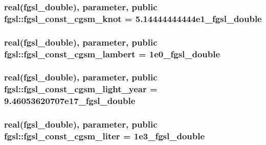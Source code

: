 \hypertarget{classfgsl_a7b637a368f16bed373b7ff18193b8417}{
\subsubsection[{fgsl\-\_\-const\-\_\-cgsm\-\_\-knot}]{\setlength{\rightskip}{0pt plus 5cm}real({\bf fgsl\-\_\-double}), parameter, public fgsl\-::fgsl\-\_\-const\-\_\-cgsm\-\_\-knot = 5.\-14444444444e1\-\_\-fgsl\-\_\-double}}\label{classfgsl_a7b637a368f16bed373b7ff18193b8417}
\hypertarget{classfgsl_a9dcbf51e3d416e2da01a503e5ba573bc}{
\subsubsection[{fgsl\-\_\-const\-\_\-cgsm\-\_\-lambert}]{\setlength{\rightskip}{0pt plus 5cm}real({\bf fgsl\-\_\-double}), parameter, public fgsl\-::fgsl\-\_\-const\-\_\-cgsm\-\_\-lambert = 1e0\-\_\-fgsl\-\_\-double}}\label{classfgsl_a9dcbf51e3d416e2da01a503e5ba573bc}
\hypertarget{classfgsl_a7a0fc1754861e860249707775c149bd8}{
\subsubsection[{fgsl\-\_\-const\-\_\-cgsm\-\_\-light\-\_\-year}]{\setlength{\rightskip}{0pt plus 5cm}real({\bf fgsl\-\_\-double}), parameter, public fgsl\-::fgsl\-\_\-const\-\_\-cgsm\-\_\-light\-\_\-year = 9.\-46053620707e17\-\_\-fgsl\-\_\-double}}\label{classfgsl_a7a0fc1754861e860249707775c149bd8}
\hypertarget{classfgsl_aa765c28c4966a92d631fc0d4721e7160}{
\subsubsection[{fgsl\-\_\-const\-\_\-cgsm\-\_\-liter}]{\setlength{\rightskip}{0pt plus 5cm}real({\bf fgsl\-\_\-double}), parameter, public fgsl\-::fgsl\-\_\-const\-\_\-cgsm\-\_\-liter = 1e3\-\_\-fgsl\-\_\-double}}\label{classfgsl_aa765c28c4966a92d631fc0d4721e7160}
